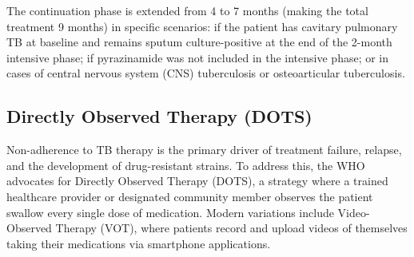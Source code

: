 The continuation phase is extended from 4 to 7 months (making the total treatment 9 months) in specific scenarios: if the patient has cavitary pulmonary TB at baseline and remains sputum culture-positive at the end of the 2-month intensive phase; if pyrazinamide was not included in the intensive phase; or in cases of central nervous system (CNS) tuberculosis or osteoarticular tuberculosis.

\subsection*{Directly Observed Therapy (DOTS)}
Non-adherence to TB therapy is the primary driver of treatment failure, relapse, and the development of drug-resistant strains. To address this, the WHO advocates for Directly Observed Therapy (DOTS), a strategy where a trained healthcare provider or designated community member observes the patient swallow every single dose of medication. Modern variations include Video-Observed Therapy (VOT), where patients record and upload videos of themselves taking their medications via smartphone applications.

